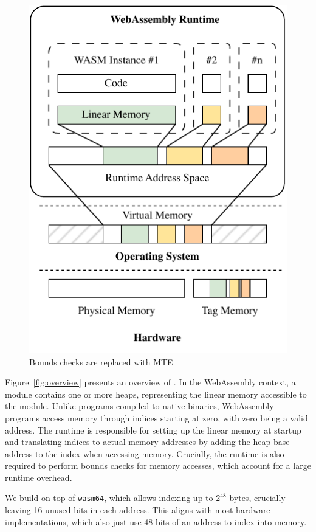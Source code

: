 \begin{figure}[t]
    \centering
    \includegraphics[scale=1]{figures/build/system-design-1}
    \caption{Bounds checks are replaced with MTE}
    \label{fig:system-design-1}
\end{figure}

Figure~\ref{fig:overview} presents an overview of \projectname{}.
In the WebAssembly context, a module contains one or more heaps, representing the linear memory accessible to the module.
Unlike programs compiled to native binaries, WebAssembly programs access memory through indices starting at zero, with zero being a valid address.
The runtime is responsible for setting up the linear memory at startup and translating indices to actual memory addresses by adding the heap base address to the index when accessing memory.
Crucially, the runtime is also required to perform bounds checks for memory accesses, which account for a large runtime overhead.

We build on top of \texttt{wasm64}, which allows indexing up to $2^{48}$ bytes, crucially leaving 16 unused bits in each address.
This aligns with most hardware implementations, which also just use 48 bits of an address to index into memory.

